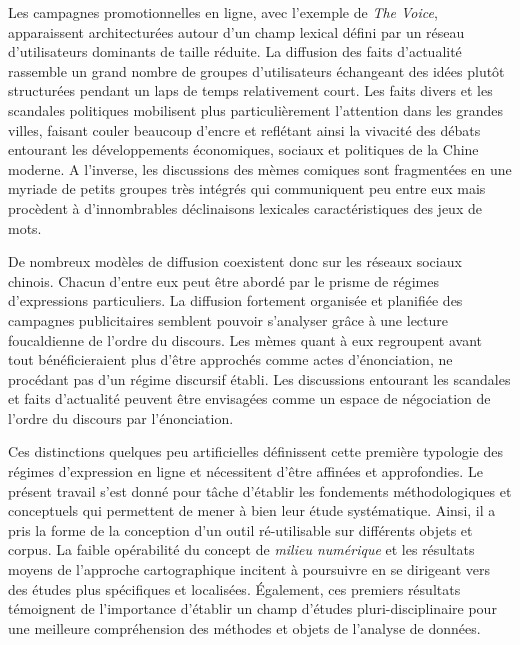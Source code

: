 Les campagnes promotionnelles en ligne, avec l’exemple de \textit{The Voice}, apparaissent architecturées autour d'un champ lexical défini par un réseau d'utilisateurs dominants de taille réduite. La diffusion des faits d'actualité rassemble un grand nombre de groupes d'utilisateurs échangeant des idées plutôt structurées pendant un laps de temps relativement court. Les faits divers et les scandales politiques mobilisent plus particulièrement l'attention dans les grandes villes, faisant couler beaucoup d'encre et reflétant ainsi la vivacité des débats entourant les développements économiques, sociaux et politiques de la Chine moderne. A l’inverse, les discussions des mèmes comiques sont fragmentées en une myriade de petits groupes très intégrés qui communiquent peu entre eux mais procèdent à d'innombrables déclinaisons lexicales caractéristiques des jeux de mots.

De nombreux modèles de diffusion coexistent donc sur les réseaux sociaux chinois. Chacun d'entre eux peut être abordé par le prisme de régimes d'expressions particuliers. La diffusion fortement organisée et planifiée des campagnes publicitaires semblent pouvoir s'analyser grâce à une lecture foucaldienne de l'ordre du discours. Les mèmes quant à eux regroupent avant tout bénéficieraient plus d'être approchés comme actes d'énonciation, ne procédant pas d'un régime discursif établi. Les discussions entourant les scandales et faits d'actualité peuvent être envisagées comme un espace de négociation de l'ordre du discours par l'énonciation.

Ces distinctions quelques peu artificielles définissent cette première typologie des régimes d'expression en ligne et nécessitent d'être affinées et approfondies. Le présent travail s'est donné pour tâche d'établir les fondements méthodologiques et conceptuels qui permettent de mener à bien leur étude systématique. Ainsi, il a pris la forme de la conception d'un outil ré-utilisable sur différents objets et corpus. La faible opérabilité du concept de \textit{milieu numérique} et les résultats moyens de l'approche cartographique incitent à poursuivre en se dirigeant vers des études plus spécifiques et localisées. Également, ces premiers résultats témoignent de l'importance d'établir un champ d'études pluri-disciplinaire pour une meilleure compréhension des méthodes et objets de l'analyse de données. 



